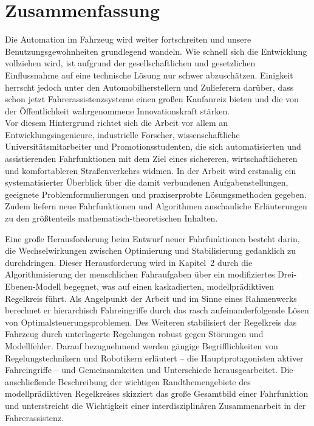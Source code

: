 \chapter{Zusammenfassung}
Die Automation im Fahrzeug wird weiter fortschreiten und unsere Benutzungsgewohnheiten grundlegend wandeln. Wie schnell sich die Entwicklung vollziehen wird, ist aufgrund der gesellschaftlichen und gesetzlichen Einflussnahme auf eine technische Lösung nur schwer abzuschätzen. Einigkeit herrscht jedoch unter den Automobilherstellern und Zulieferern darüber, dass schon jetzt Fahrerassistenzsysteme einen großen Kaufanreiz bieten und die von der Öffentlichkeit wahrgenommene Innovationskraft stärken. \\
Vor diesem Hintergrund richtet sich die Arbeit vor allem an Entwicklungsingenieure, industrielle Forscher, wissenschaftliche Universitätsmitarbeiter und Promotionsstudenten, die sich automatisierten und assistierenden Fahrfunktionen mit dem Ziel eines sichereren, wirtschaftlicheren und komfortableren Straßenverkehrs widmen. 
In der Arbeit wird erstmalig ein systematisierter Überblick über die damit verbundenen Aufgabenstellungen, geeignete Problemformulierungen und praxiserprobte Lösungsmethoden gegeben.  Zudem liefern neue Fahrfunktionen und Algorithmen anschauliche Erläuterungen zu den größtenteils mathematisch-theoretischen Inhalten.

Eine große Herausforderung beim Entwurf neuer Fahrfunktionen besteht darin, die Wechselwirkungen zwischen Optimierung und Stabilisierung gedanklich zu durchdringen. Dieser Herausforderung wird in Kapitel~2 durch die Algorithmisierung der menschlichen Fahraufgaben über ein modifiziertes Drei-Ebenen-Modell begegnet, was auf einen kaskadierten, modellprädiktiven Regelkreis führt. Als Angelpunkt der Arbeit und im Sinne eines Rahmenwerks berechnet er hierarchisch Fahreingriffe durch das rasch aufeinanderfolgende Lösen von Optimalsteuerungsproblemen. Des Weiteren stabilisiert der Regelkreis das Fahrzeug durch unterlagerte Regelungen robust gegen Störungen und Modellfehler. Darauf bezugnehmend werden gängige Begrifflichkeiten von Regelungstechnikern und Robotikern erläutert -- die Hauptprotagonisten aktiver Fahreingriffe -- und Gemeinsamkeiten und Unterschiede herausgearbeitet. Die anschließende Beschreibung der wichtigen Randthemengebiete des modellprädiktiven Regelkreises skizziert das große Gesamtbild einer Fahrfunktion und unterstreicht die Wichtigkeit einer interdisziplinären Zusammenarbeit in der Fahrerassistenz. 

